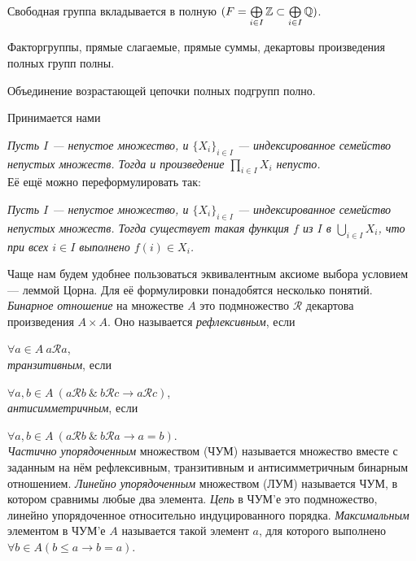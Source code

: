 \documentclass[10pt,a4paper]{article}
\begin{document}
\begin{stm} Свободная группа вкладывается в полную
$(F=\bigoplus\limits_{i\in I}\mathbb Z\subset\bigoplus\limits_{i\in
I}\mathbb Q)$.
\end{stm}

\begin{stm} Факторгруппы, прямые слагаемые, прямые суммы,
декартовы произведения полных групп полны.
\end{stm}

\begin{stm}
Объединение возрастающей цепочки полных подгрупп полно.
\end{stm}

Принимается нами

\vskip 2pt
{\sl Пусть $I$
--- непустое множество, и $\{X_i\}_{i\in I}$ --- индексированное
семейство непустых множеств. Тогда и произведение
$\prod\limits_{i\in I}X_i$ непусто.}
\\ Её ещё можно переформулировать так:
\par {\sl Пусть $I$ --- непустое множество, и $\{X_i\}_{i\in I}$ ---
индексированное семейство непустых множеств. Тогда существует
такая функция $f$ из $I$ в $\bigcup\limits_{i\in I}X_i$, что при
всех $i\in I$ выполнено $f(i)\in X_i$.}

Чаще нам будем удобнее пользоваться эквивалентным аксиоме выбора
условием --- леммой Цорна. Для её формулировки понадобятся
несколько понятий. \emph{Бинарное
отношение} на множестве $A$ это
подмножество $\mathcal{R}$ декартова произведения $A\times A$. Оно
называется {\em рефлексивным}, если

\hfil$\forall a\in A~a\mathcal{R}a$,\hfil\\ {\em
транзитивным}, если

\hfil$\forall a,b\in A~
(a\mathcal{R}b~\&~b\mathcal{R}c\rightarrow a\mathcal{R}c)$,\hfil\\
{\em антисимметричным}, если

\hfil$\forall a,b\in A~ (a\mathcal{R}b~\&~
b\mathcal{R}a\rightarrow a=b)$.\hfil\\ {\em Частично
упорядоченным}
множеством (ЧУМ) называется множество вместе с заданным на нём
рефлексивным, транзитивным и антисимметричным бинарным отношением.
{\em Линейно упорядоченным} множеством (ЛУМ) называется ЧУМ, в котором сравнимы любые
два элемента. {\em Цепь} в ЧУМ'е это подмножество,
линейно упорядоченное относительно индуцированного порядка. {\em
Максимальным} элементом в ЧУМ'е $A$
называется такой элемент $a$, для которого выполнено $\forall b\in
A (b\leqslant a \rightarrow b=a)$.
\end{document}
